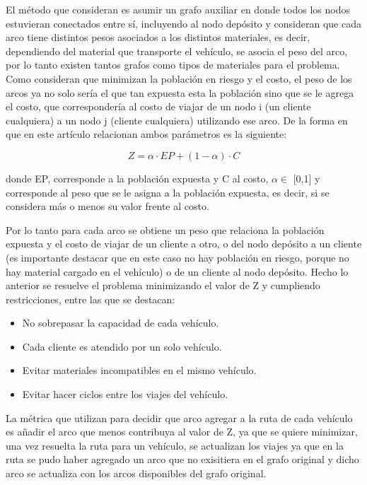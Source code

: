 \documentclass[conference]{IEEEtran}
\begin{document}
El m\'etodo que consideran es asumir un grafo auxiliar en donde todos los nodos estuvieran conectados entre s\'i, incluyendo al nodo dep\'osito y consideran que cada arco tiene distintos pesos asociados a los distintos materiales, es decir, dependiendo del material que transporte el veh\'iculo, se asocia el peso del arco, por lo tanto existen tantos grafos como tipos de materiales para el problema. Como consideran que minimizan la poblaci\'on en riesgo y el costo, el peso de los arcos ya no solo ser\'ia el que tan expuesta esta la poblaci\'on sino que se le agrega el costo, que corresponder\'ia al costo de viajar de un nodo i (un cliente cualquiera) a un nodo j (cliente cualquiera) utilizando ese arco. De la forma en que en este art\'iculo relacionan ambos par\'ametros es la siguiente: 

           \[Z = \alpha \cdot EP + (1 - \alpha) \cdot C\]
           
donde EP, corresponde a la poblaci\'on expuesta y C al costo, $\alpha \in $ [0,1] y corresponde al peso que se le asigna a la poblaci\'on expuesta, es decir, si se considera m\'as o menos su valor frente al costo. 

Por lo tanto para cada arco se obtiene un peso que relaciona la poblaci\'on expuesta y el costo de viajar de un cliente a otro, o del nodo dep\'osito a un cliente (es importante destacar que en este caso no hay poblaci\'on en riesgo, porque no hay material cargado en el veh\'iculo) o de un cliente al nodo dep\'osito. Hecho lo anterior se resuelve el problema minimizando el valor de Z y cumpliendo restricciones, entre las que se destacan:

\begin{itemize}
    \item No sobrepasar la capacidad de cada veh\'iculo.
    \item Cada cliente es atendido por un solo veh\'iculo.
    \item Evitar materiales incompatibles en el mismo veh\'iculo.
    \item Evitar hacer ciclos entre los viajes del veh\'iculo.
\end{itemize}

La m\'etrica que utilizan para decidir que arco agregar a la ruta de cada veh\'iculo es a\~nadir el arco que menos contribuya al valor de Z, ya que se quiere minimizar, una vez resuelta la ruta para un veh\'iculo, se actualizan los viajes ya que en la ruta se pudo haber agregado un arco que no exisitiera en el grafo original y dicho arco se actualiza con los arcos disponibles del grafo original.
\\
\end{document}
